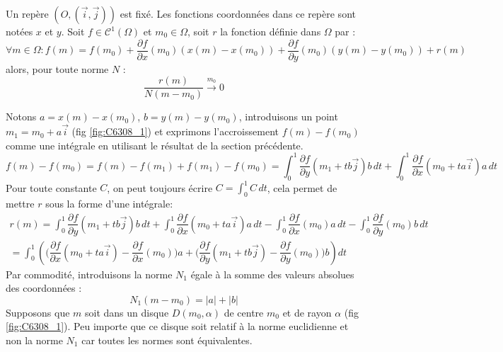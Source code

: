\begin{thm}
 Un repère $(O,(\overrightarrow i, \overrightarrow j))$ est fixé. Les fonctions coordonnées dans ce repère sont notées $x$ et $y$. Soit $f\in \mathcal C^1(\Omega)$ et $m_0\in \Omega$, soit $r$ la fonction définie dans $\Omega$ par :
\begin{displaymath}
 \forall m \in \Omega :
f(m) = f(m_0) +\dfrac{\partial f}{\partial x}(m_0)(x(m)-x(m_0))
+\dfrac{\partial f}{\partial y}(m_0)(y(m)-y(m_0)) +r(m)
\end{displaymath}
alors, pour toute norme $N$ :
\begin{displaymath}
 \frac{r(m)}{N(m-m_0)} \xrightarrow{m_0} 0
\end{displaymath}
\end{thm}
\begin{demo}
 Notons $a=x(m)-x(m_0)$, $b=y(m)-y(m_0)$, introduisons un point $m_1=m_0+a\overrightarrow i$ (fig \ref{fig:C6308_1}) et exprimons l'accroissement $f(m)-f(m_0)$ comme une intégrale en utilisant le résultat de la section précédente.
\begin{displaymath}
 f(m)-f(m_0)=f(m)-f(m_1)+ f(m_1)-f(m_0)
= 
\int_{0}^1 \dfrac{\partial f}{\partial y}\left( m_1+tb\overrightarrow j\right)b \,dt
+
\int_{0}^1 \dfrac{\partial f}{\partial x}\left( m_0+ta\overrightarrow i\right)a \,dt 
\end{displaymath}
Pour toute constante $C$, on peut toujours écrire $C=\int_0^1 C\,dt$, cela permet de mettre $r$ sous la forme d'une intégrale:
\begin{multline*}
 r(m)= \int_{0}^1 \dfrac{\partial f}{\partial y}\left( m_1+tb\overrightarrow j\right)b \,dt
+
\int_{0}^1 \dfrac{\partial f}{\partial x}\left( m_0+ta\overrightarrow i\right)a \,dt 
- \int_{0}^1 \dfrac{\partial f}{\partial x}(m_0)a\,dt 
- \int_{0}^1 \dfrac{\partial f}{\partial y}(m_0)b\,dt \\
= \int_{0}^1 \left(
\Big(
\dfrac{\partial f}{\partial x}\left( m_0+ta\overrightarrow i\right)
-
\dfrac{\partial f}{\partial x}(m_0)
\Big)a
+
\Big(
\dfrac{\partial f}{\partial y}\left( m_1+tb\overrightarrow j\right)
-
\dfrac{\partial f}{\partial y}(m_0)
\Big)b
\right)dt
\end{multline*}
Par commodité, introduisons la norme $N_1$ égale à la somme des valeurs absolues des coordonnées :
\begin{displaymath}
 N_1(m-m_0)=|a|+|b|
\end{displaymath}
Supposons que $m$ soit dans un disque $D(m_0,\alpha)$ de centre $m_0$ et de rayon $\alpha$ (fig \ref{fig:C6308_1}). Peu importe que ce disque soit relatif à la norme euclidienne et non la norme $N_1$ car toutes les normes sont équivalentes.\newline

\end{demo}
